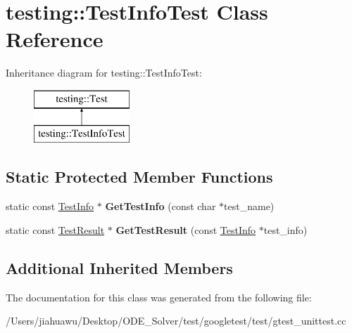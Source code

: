 \hypertarget{classtesting_1_1_test_info_test}{}\section{testing\+:\+:Test\+Info\+Test Class Reference}
\label{classtesting_1_1_test_info_test}
Inheritance diagram for testing\+:\+:Test\+Info\+Test\+:\begin{figure}[H]
\begin{center}
\leavevmode
\includegraphics[height=2.000000cm]{classtesting_1_1_test_info_test}
\end{center}
\end{figure}
\subsection*{Static Protected Member Functions}
\begin{DoxyCompactItemize}
\item 
\mbox{\label{classtesting_1_1_test_info_test_a4140c1302bf53c7f1375a23923624f04}} 
static const \mbox{\hyperlink{classtesting_1_1_test_info}{Test\+Info}} $\ast$ {\bfseries Get\+Test\+Info} (const char $\ast$test\+\_\+name)
\item 
\mbox{\label{classtesting_1_1_test_info_test_a154b3679b1aa00ad037ce46eb60d18c3}} 
static const \mbox{\hyperlink{classtesting_1_1_test_result}{Test\+Result}} $\ast$ {\bfseries Get\+Test\+Result} (const \mbox{\hyperlink{classtesting_1_1_test_info}{Test\+Info}} $\ast$test\+\_\+info)
\end{DoxyCompactItemize}
\subsection*{Additional Inherited Members}


The documentation for this class was generated from the following file\+:\begin{DoxyCompactItemize}
\item 
/\+Users/jiahuawu/\+Desktop/\+O\+D\+E\+\_\+\+Solver/test/googletest/test/gtest\+\_\+unittest.\+cc\end{DoxyCompactItemize}
